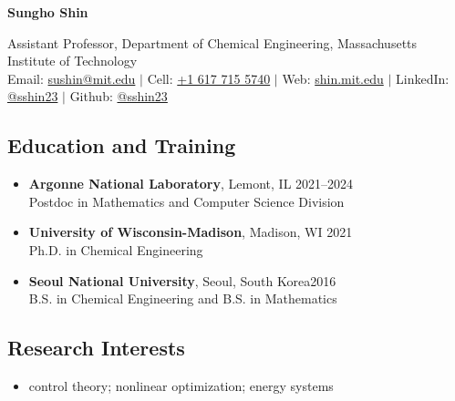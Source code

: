 \documentclass[letterpaper, 11pt]{article}
\begin{document}
\thispagestyle{empty}
\begin{center}
  {\bf\Large Sungho Shin}
\end{center}
\begin{center}
  {Assistant Professor}, Department of Chemical Engineering, {Massachusetts Institute of Technology}\\
  Email: \href{mailto:sushin@mit.edu}{sushin@mit.edu} $|$ Cell: \href{tel:16177155740}{+1 617 715 5740} $|$ Web: \href{https://shin.mit.edu}{shin.mit.edu} $|$ LinkedIn: \href{https://www.linkedin.com/in/sshin23/}{@sshin23} $|$ Github: \href{https://github.com/sshin23}{@sshin23}
\end{center}


\subsection*{Education and Training}
\begin{itemize}[itemsep=1pt, parsep=0pt,leftmargin=*]
\item[]
  {\bf Argonne National Laboratory}, Lemont, IL \hfill 2021--2024\\
  {Postdoc in Mathematics and Computer Science Division}
\item[]
  {\bf University of Wisconsin-Madison}, Madison, WI \hfill 2021\\
  {Ph.D. in Chemical Engineering}
\item[]
  {\bf Seoul National University}, Seoul, South Korea\hfill 2016 \\
  {B.S. in Chemical Engineering} and {B.S. in Mathematics}
\end{itemize}

\subsection*{Research Interests}
\begin{itemize}[leftmargin=*]
\item[] control theory; nonlinear optimization; energy systems
\end{itemize}
\end{document}
